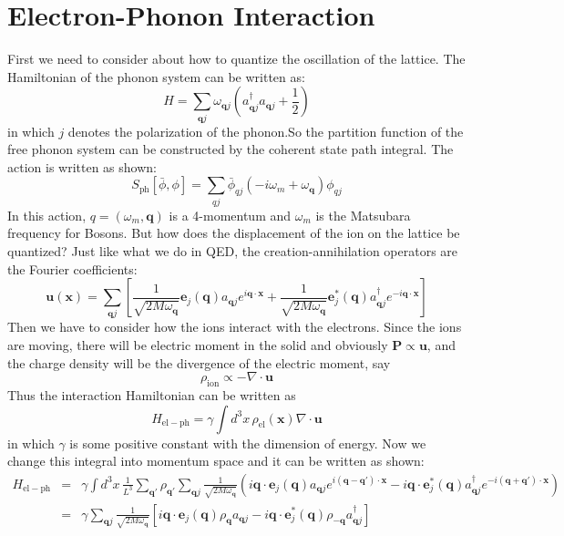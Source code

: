 \documentclass{article}
\newcommand{\mtq}{\mathbf{q}}
\newcommand{\pnx}{\mathbf{x}}
\begin{document}
\section{Electron-Phonon Interaction}
First we need to consider about how to quantize the oscillation of the lattice. The Hamiltonian of the phonon system can be written as:
$$
H = \sum_{\mtq  j} \omega_{\mtq j} \left(a^\dagger_{\mtq j}a_{\mtq j}+\frac{1}{2}\right)
$$
in which $ j$ denotes the polarization of the phonon.So the partition function of the free phonon system can be constructed by the coherent state path integral. The action is written as shown:
\begin{equation}
S_{\mathrm{ph}}[\bar{\phi},\phi] = \sum_{qj}\bar{\phi}_{q j}\left(-i\omega_m + \omega_\mtq\right)\phi_{q j}
\end{equation}
In this action, $q = (\omega_m,\mtq)$ is a 4-momentum and $\omega_m$ is the Matsubara frequency for Bosons. But how does the displacement of the ion on the lattice be quantized? Just like what we do in QED, the creation-annihilation operators are the Fourier coefficients:
\begin{equation}
\mathbf{u}(\mathbf{x}) = \sum_{\mtq j}\left[\frac{1}{\sqrt{2M\omega_\mtq}}\mathbf{e}_j(\mtq)a_{\mtq j}e^{i\mtq\cdot\pnx} + \frac{1}{\sqrt{2M\omega_\mtq}}\mathbf{e}^*_j(\mtq)a^\dagger_{\mtq j}e^{-i\mtq\cdot\pnx}\right]
\end{equation}
Then we have to consider how the ions interact with the electrons. Since the ions are moving, there will be electric moment in the solid and obviously $\mathbf{P}\propto \mathbf{u}$, and the charge density will be the divergence of the electric moment, say
$$
\rho_{\mathrm{ion}} \propto -\nabla \cdot \mathbf{u}
$$ 
Thus the interaction Hamiltonian can be written as
$$
H_{\mathrm{el-ph}} = \gamma \int d^3x \,\rho_{\mathrm{el}}(\mathbf{x}) \nabla\cdot\mathbf{u}
$$
in which $\gamma$ is some positive constant with the dimension of energy. Now we change this integral into momentum space and it can be written as shown:
\begin{eqnarray}
H_{\mathrm{el-ph}} & = & \gamma\int d^3x\, \frac{1}{L^3} \sum_{\mtq'}\rho_{\mtq'}\sum_{\mtq j}\frac{1}{\sqrt{2M\omega_{\mtq}}}\left(i\mtq \cdot \mathbf{e}_j(\mtq)a_{\mtq j}e^{i(\mtq-\mtq')\cdot \pnx} - i\mtq \cdot \mathbf{e}_j^*(\mtq)a^\dagger_{\mtq j}e^{-i(\mtq+\mtq')\cdot\pnx}\right)\nonumber\\ 
&=& \gamma \sum_{\mtq j} \frac{1}{\sqrt{2M\omega_\mtq}}\left[i\mtq \cdot \mathbf{e}_j(\mtq)\rho_\mtq a_{\mtq j}-i\mtq \cdot \mathbf{e}_j^*(\mtq)\rho_{-\mtq}a^\dagger_{\mtq j}\right]
\end{eqnarray}
\end{document}
